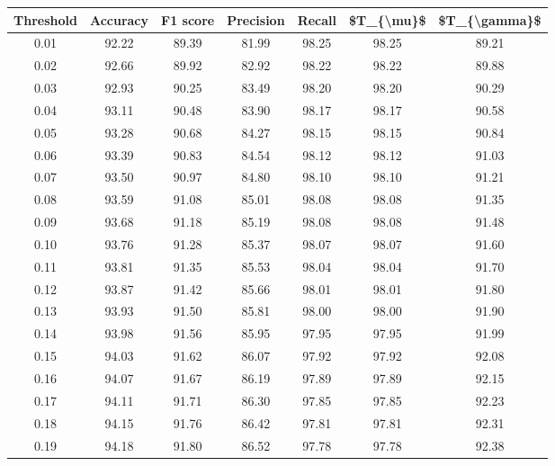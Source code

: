 \begin{tabular}{|c|c|c|c|c|c|c|}
\hline
 Threshold &  Accuracy &  F1 score &  Precision &  Recall &  \$T\_\{\textbackslash mu\}\$ &  \$T\_\{\textbackslash gamma\}\$ \\
\hline
      0.01 &     92.22 &     89.39 &      81.99 &   98.25 &      98.25 &         89.21 \\
      0.02 &     92.66 &     89.92 &      82.92 &   98.22 &      98.22 &         89.88 \\
      0.03 &     92.93 &     90.25 &      83.49 &   98.20 &      98.20 &         90.29 \\
      0.04 &     93.11 &     90.48 &      83.90 &   98.17 &      98.17 &         90.58 \\
      0.05 &     93.28 &     90.68 &      84.27 &   98.15 &      98.15 &         90.84 \\
      0.06 &     93.39 &     90.83 &      84.54 &   98.12 &      98.12 &         91.03 \\
      0.07 &     93.50 &     90.97 &      84.80 &   98.10 &      98.10 &         91.21 \\
      0.08 &     93.59 &     91.08 &      85.01 &   98.08 &      98.08 &         91.35 \\
      0.09 &     93.68 &     91.18 &      85.19 &   98.08 &      98.08 &         91.48 \\
      0.10 &     93.76 &     91.28 &      85.37 &   98.07 &      98.07 &         91.60 \\
      0.11 &     93.81 &     91.35 &      85.53 &   98.04 &      98.04 &         91.70 \\
      0.12 &     93.87 &     91.42 &      85.66 &   98.01 &      98.01 &         91.80 \\
      0.13 &     93.93 &     91.50 &      85.81 &   98.00 &      98.00 &         91.90 \\
      0.14 &     93.98 &     91.56 &      85.95 &   97.95 &      97.95 &         91.99 \\
      0.15 &     94.03 &     91.62 &      86.07 &   97.92 &      97.92 &         92.08 \\
      0.16 &     94.07 &     91.67 &      86.19 &   97.89 &      97.89 &         92.15 \\
      0.17 &     94.11 &     91.71 &      86.30 &   97.85 &      97.85 &         92.23 \\
      0.18 &     94.15 &     91.76 &      86.42 &   97.81 &      97.81 &         92.31 \\
      0.19 &     94.18 &     91.80 &      86.52 &   97.78 &      97.78 &         92.38 \\

\end{tabular}
